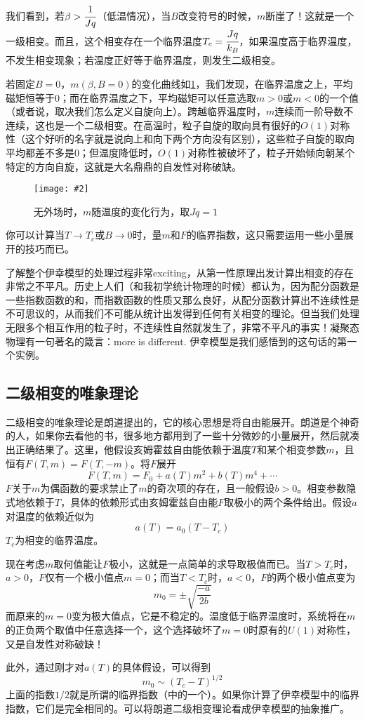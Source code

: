 \documentclass[a4paper,11pt]{ctexart}
\newcommand{\beq}{\begin{equation}}
\newcommand{\eeq}{\end{equation}}
\newcommand{\red}{\color{red}}
\newcommand{\cpic}[2]{
\begin{center}
\texttt{[image: \#2]}
\end{center}
}
\newcommand{\cpicn}[3]
{
\begin{figure}[H]
\cpic{#1}{#2}
\caption{#3\label{#2}}
\end{figure}
}
\begin{document}
\par
我们看到，若$\beta > \cfrac{1}{Jq}$（低温情况），当$B$改变符号的时候，$m$断崖了！这就是一个一级相变。而且，这个相变存在一个临界温度$T_c = \cfrac{Jq}{k_B}$，如果温度高于临界温度，不发生相变现象；若温度正好等于临界温度，则发生二级相变。
\par
若固定$B = 0$，$m(\beta,B=0)$的变化曲线如\cref{isingtrans}，我们发现，在临界温度之上，平均磁矩恒等于0；而在临界温度之下，平均磁矩可以任意选取$m>0$或$m<0$的一个值（或者说，取决我们怎么定义自旋向上）。跨越临界温度时，$m$连续而一阶导数不连续，这也是一个二级相变。在高温时，粒子自旋的取向具有很好的$O(1)$对称性（这个好听的名字就是说向上和向下两个方向没有区别），这些粒子自旋的取向平均都差不多是0；但温度降低时，$O(1)$对称性被破坏了，粒子开始倾向朝某个特定的方向自旋，这就是大名鼎鼎的{\red 自发性对称破缺}。
\cpicn{0.3}{isingtrans}{无外场时，$m$随温度的变化行为，取$Jq = 1$}
\par
你可以计算当$T\to T_c$或$B \to 0$时，量$m$和$F$的临界指数，这只需要运用一些小量展开的技巧而已。
\par
了解整个伊幸模型的处理过程非常exciting，从第一性原理出发计算出相变的存在非常之不平凡。历史上人们（和我初学统计物理的时候）都认为，因为配分函数是一些指数函数的和，而指数函数的性质又那么良好，从配分函数计算出不连续性是不可思议的，从而我们不可能从统计出发得到任何有关相变的理论。但当我们处理无限多个相互作用的粒子时，不连续性自然就发生了，非常不平凡的事实！凝聚态物理有一句著名的箴言：more is different. 伊幸模型是我们感悟到的这句话的第一个实例。

\subsection{二级相变的唯象理论}
二级相变的唯象理论是朗道提出的，它的核心思想是将自由能展开。朗道是个神奇的人，如果你去看他的书，很多地方都用到了一些十分微妙的小量展开，然后就凑出正确结果了。这里，他假设亥姆霍兹自由能依赖于温度$T$和某个相变参数$m$，且恒有$F(T,m) = F(T,-m)$。将$F$展开
\beq
F(T,m) = F_0 + a(T)m^2 + b(T)m^4 + \cdots
\eeq
$F$关于$m$为偶函数的要求禁止了$m$的奇次项的存在，且一般假设$b>0$。相变参数隐式地依赖于$T$，具体的依赖形式由亥姆霍兹自由能$F$取极小的两个条件给出。假设$a$对温度的依赖近似为
\beq
a(T) = a_0 (T-T_c)
\eeq
$T_c$为相变的临界温度。
\par
现在考虑$m$取何值能让$F$极小，这就是一点简单的求导取极值而已。当$T>T_c$时，$a>0$，$F$仅有一个极小值点$m=0$；而当$T<T_c$时，$a<0$，$F$的两个极小值点变为
\beq
m_0 = \pm \sqrt{\frac{-a}{2b}}
\eeq
而原来的$m=0$变为极大值点，它是不稳定的。温度低于临界温度时，系统将在$m$的正负两个取值中任意选择一个，这个选择破坏了$m=0$时原有的$U(1)$对称性，又是自发性对称破缺！
\par
此外，通过刚才对$a(T)$的具体假设，可以得到
\beq
m_0 \sim (T_c - T)^{1/2}
\eeq
上面的指数$1/2$就是所谓的临界指数（中的一个）。如果你计算了伊幸模型中的临界指数，它们是完全相同的。可以将朗道二级相变理论看成伊幸模型的抽象推广。
\end{document}
